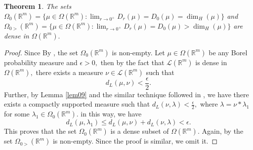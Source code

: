 \documentclass{amsproc}
\newtheorem{theorem}{Theorem}[section]
\theoremstyle{definition}
\theoremstyle{remark}
\numberwithin{equation}{section}
\begin{document}
\begin{theorem}
    The sets $\Omega_0({\mathbb{R}^m})=\{\mu \in \Omega(\mathbb{R}^m): \lim_{r \to 0^+}D_r(\mu) =D_0(\mu)= \dim_H(\mu)\}$ and $\Omega_{0>}({\mathbb{R}^m})=\{\mu \in \Omega(\mathbb{R}^m): \lim_{r \to 0^+}D_r(\mu) =D_0(\mu)>\dim_H(\mu)\}$  are dense in $\Omega(\mathbb{R}^m).$
\end{theorem}
\begin{proof}
Since By \cite[Remark 4.6]{GL3}, the set $\Omega_0({\mathbb{R}^m})$ is non-empty. Let $\mu \in \Omega(\mathbb{R}^m)$ be any Borel probability measure and $\epsilon >0,$ then by the fact that $\mathcal{L}(\mathbb{R}^m)$ is dense in $\Omega(\mathbb{R}^m),$ there exists a measure $\nu \in \mathcal{L}(\mathbb{R}^m)$ such that
$$d_L(\mu, \nu) < \frac{\epsilon}{2}.$$ Further, by Lemma \ref{lem09} and the similar technique followed in \cite[Theorem 3.16]{VAD}, we have there exists a compactly supported measure such that $d_L(\nu, \lambda) < \frac{\epsilon}{2},$ where $\lambda = \nu * \lambda_1$ for some $\lambda_1 \in \Omega_0({\mathbb{R}^m}).$ in this way, we have $$d_L(\mu, \lambda_1) \le d_L(\mu,\nu)+ d_L(\nu,\lambda) < \epsilon.$$
This proves that the set $\Omega_0({\mathbb{R}^m})$ is a dense subset of $\Omega(\mathbb{R}^m).$
Again, by \cite[Theorem 4.3]{GL3} the set $\Omega_{0>}({\mathbb{R}^m})$ is non-empty. Since the proof is similar, we omit it.

\end{proof}
\end{document}
